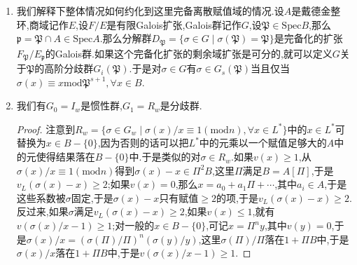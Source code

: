 \begin{enumerate}
\begin{enumerate}
\begin{proof}
        	按照上一条,我们有$v_L(\mathfrak{D}_{L/K})=\sum_{\sigma\not=1}i_G(\sigma)$和$v_L(\mathfrak{D}_{L/K'})=\sum_{1\not=\sigma\in H}i_G(\sigma)$.于是有:
        	\begin{align*}
        		v_{K'}(\mathfrak{D}_{K'/K})&=\frac{1}{e_{L/K'}}v_L(\mathfrak{D}_{K'/K})\\&=\frac{1}{e_{L/K'}}v_L(\mathfrak{D}_{L/K}\mathfrak{D}_{L/K'}^{-1})\\&=\frac{1}{e_{L/K'}}\left(\sum_{\sigma\not=1}i_G(\sigma)-\sum_{1\not=\sigma\in H}i_G(\sigma)\right)\\&=\frac{1}{e_{L/K'}}\sum_{\sigma\not\in H}i_G(\sigma)
        	\end{align*}
        \end{proof}
    \end{enumerate}
    \item 我们解释下整体情况如何约化到这里完备离散赋值域的情况.设$A$是戴德金整环,商域记作$E$,设$F/E$是有限Galois扩张,Galois群记作$G$,设$\mathfrak{P}\in\mathrm{Spec}B$,那么$\mathfrak{p}=\mathfrak{P}\cap A\in\mathrm{Spec}A$.那么分解群$D_{\mathfrak{P}}=\{\sigma\in G\mid\sigma(\mathfrak{P})=\mathfrak{P}\}$是完备化的扩张$F_{\mathfrak{P}}/E_{\mathfrak{p}}$的Galois群.如果这个完备化扩张的剩余域扩张是可分的,就可以定义$G$关于$\mathfrak{P}$的高阶分歧群$G_i(\mathfrak{P})$.于是对$\sigma\in G$有$\sigma\in G_s(\mathfrak{P})$当且仅当$\sigma(x)\equiv x\mathrm{mod}\mathfrak{P}^{s+1},\forall x\in B$.
    \item 我们有$G_0=I_w$是惯性群,$G_1=R_w$是分歧群.
    \begin{proof}
    	
    	注意到$R_w=\{\sigma\in G_w\mid\sigma(x)/x\equiv1(\mathrm{mod}n),\forall x\in L^*\}$中的$x\in L^*$可替换为$x\in B-\{0\}$,因为否则的话可以把$L^*$中的元乘以一个赋值足够大的$A$中的元使得结果落在$B-\{0\}$中.于是类似的对$\sigma\in R_w$.如果$v(x)\ge1$,从$\sigma(x)/x\equiv1(\mathrm{mod}n)$得到$\sigma(x)-x\in\Pi^2B$,这里$\Pi$满足$B=A[\Pi]$,于是$v_L(\sigma(x)-x)\ge2$;如果$v(x)=0$,那么$x=a_0+a_1\Pi+\cdots$,其中$a_i\in A$,于是这些系数被$\sigma$固定,于是$\sigma(x)-x$只有赋值$\ge2$的项,于是$v_L(\sigma(x)-x)\ge2$.反过来,如果$\sigma$满足$v_L(\sigma(x)-x)\ge2$,如果$v(x)\le1$,就有$v(\sigma(x)/x-1)\ge1$;对一般的$x\in B-\{0\}$,可记$x=\Pi^ny$,其中$v(y)=0$,于是$\sigma(x)/x=\left(\sigma(\Pi)/\Pi\right)^n(\sigma(y)/y)$,这里$\sigma(\Pi)/\Pi$落在$1+\Pi B$中,于是$\sigma(x)/x$落在$1+\Pi B$中,于是$v(\sigma(x)/x-1)\ge1$.
    \end{proof}
\end{enumerate}

